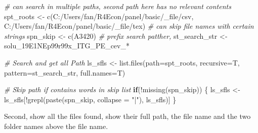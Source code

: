 \documentclass[
]{book}
\newenvironment{Shaded}{\begin{snugshade}}{\end{snugshade}}
\newcommand{\AttributeTok}[1]{\textcolor[rgb]{0.77,0.63,0.00}{#1}}
\newcommand{\CommentTok}[1]{\textcolor[rgb]{0.56,0.35,0.01}{\textit{#1}}}
\newcommand{\ControlFlowTok}[1]{\textcolor[rgb]{0.13,0.29,0.53}{\textbf{#1}}}
\newcommand{\FunctionTok}[1]{\textcolor[rgb]{0.00,0.00,0.00}{#1}}
\newcommand{\NormalTok}[1]{#1}
\newcommand{\OtherTok}[1]{\textcolor[rgb]{0.56,0.35,0.01}{#1}}
\newcommand{\SpecialCharTok}[1]{\textcolor[rgb]{0.00,0.00,0.00}{#1}}
\newcommand{\StringTok}[1]{\textcolor[rgb]{0.31,0.60,0.02}{#1}}
\begin{document}
\begin{Shaded}
\begin{Highlighting}[]
\CommentTok{\# can search in multiple paths, second path here has no relevant contents}
\NormalTok{spt\_roots }\OtherTok{\textless{}{-}} \FunctionTok{c}\NormalTok{(}\StringTok{\textquotesingle{}C:/Users/fan/R4Econ/panel/basic/\_file/csv\textquotesingle{}}\NormalTok{,}
               \StringTok{\textquotesingle{}C:/Users/fan/R4Econ/panel/basic/\_file/tex\textquotesingle{}}\NormalTok{)}
\CommentTok{\# can skip file names with certain strings}
\NormalTok{spn\_skip }\OtherTok{\textless{}{-}} \FunctionTok{c}\NormalTok{(}\StringTok{\textquotesingle{}A3420\textquotesingle{}}\NormalTok{)}
\CommentTok{\# prefix search patther,}
\NormalTok{st\_search\_str }\OtherTok{\textless{}{-}} \StringTok{\textquotesingle{}solu\_19E1NEp99r99x\_ITG\_PE\_cev\_*\textquotesingle{}}

\CommentTok{\# Search and get all Path}
\NormalTok{ls\_sfls }\OtherTok{\textless{}{-}} \FunctionTok{list.files}\NormalTok{(}\AttributeTok{path=}\NormalTok{spt\_roots,}
                      \AttributeTok{recursive=}\NormalTok{T,}
                      \AttributeTok{pattern=}\NormalTok{st\_search\_str,}
                      \AttributeTok{full.names=}\NormalTok{T)}

\CommentTok{\# Skip path if contains words in skip list}
\ControlFlowTok{if}\NormalTok{(}\SpecialCharTok{!}\FunctionTok{missing}\NormalTok{(spn\_skip)) \{}
\NormalTok{  ls\_sfls }\OtherTok{\textless{}{-}}\NormalTok{ ls\_sfls[}\SpecialCharTok{!}\FunctionTok{grepl}\NormalTok{(}\FunctionTok{paste}\NormalTok{(spn\_skip, }\AttributeTok{collapse =} \StringTok{"|"}\NormalTok{), ls\_sfls)]}
\NormalTok{\}}
\end{Highlighting}
\end{Shaded}

Second, show all the files found, show their full path, the file name and the two folder names above the file name.
\end{document}
